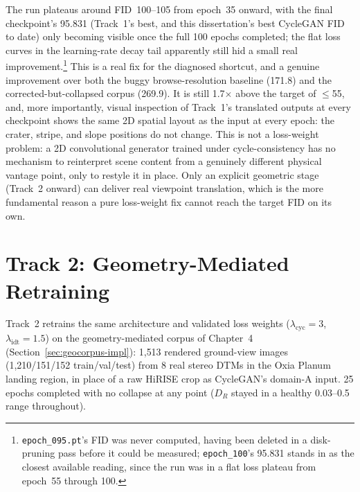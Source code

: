 The run plateaus around FID~100--105 from epoch~35 onward, with the final checkpoint's 95.831 (Track~1's best, and this dissertation's best CycleGAN FID to date) only becoming visible once the full 100 epochs completed; the flat loss curves in the learning-rate decay tail apparently still hid a small real improvement.\footnote{\texttt{epoch\_095.pt}'s FID was never computed, having been deleted in a disk-pruning pass before it could be measured; \texttt{epoch\_100}'s 95.831 stands in as the closest available reading, since the run was in a flat loss plateau from epoch~55 through 100.} This is a real fix for the diagnosed shortcut, and a genuine improvement over both the buggy browse-resolution baseline (171.8) and the corrected-but-collapsed corpus (269.9). It is still 1.7$\times$ above the target of $\leq$55, and, more importantly, visual inspection of Track~1's translated outputs at every checkpoint shows the same 2D spatial layout as the input at every epoch: the crater, stripe, and slope positions do not change. This is not a loss-weight problem: a 2D convolutional generator trained under cycle-consistency has no mechanism to reinterpret scene content from a genuinely different physical vantage point, only to restyle it in place. Only an explicit geometric stage (Track~2 onward) can deliver real viewpoint translation, which is the more fundamental reason a pure loss-weight fix cannot reach the target FID on its own.

\section{Track 2: Geometry-Mediated Retraining}
\label{sec:track2}

Track~2 retrains the same architecture and validated loss weights ($\lambda_{\mathrm{cyc}}=3$, $\lambda_{\mathrm{idt}}=1.5$) on the geometry-mediated corpus of Chapter~4 (Section~\ref{sec:geocorpus-impl}): 1{,}513 rendered ground-view images (1{,}210/151/152 train/val/test) from 8 real stereo DTMs in the Oxia Planum landing region, in place of a raw HiRISE crop as CycleGAN's domain-A input. 25 epochs completed with no collapse at any point ($D_R$ stayed in a healthy 0.03--0.5 range throughout).

